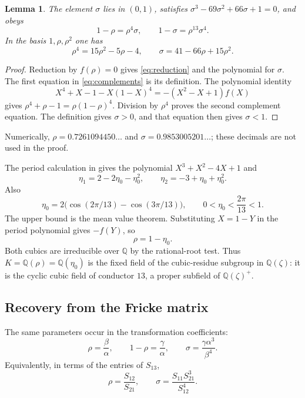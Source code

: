 \documentclass[11pt,reqno]{amsart}
\newtheorem{lemma}[theorem]{Lemma}
\theoremstyle{remark}
\numberwithin{equation}{section}
\newcommand{\QQ}{\mathbb Q}
\begin{document}
\begin{lemma}\label{lem:algebra}
The element $\sigma$ lies in $(0,1)$, satisfies
$\sigma^3-69\sigma^2+66\sigma+1=0$, and obeys
\begin{equation}\label{eq:complements}
 1-\rho=\rho^4\sigma,\qquad 1-\sigma=\rho^{13}\sigma^4.
\end{equation}
In the basis $1,\rho,\rho^2$ one has
\begin{equation}\label{eq:reduction}
 \rho^4=15\rho^2-5\rho-4,\qquad \sigma=41-66\rho+15\rho^2.
\end{equation}
\end{lemma}
\begin{proof}
Reduction by $f(\rho)=0$ gives \eqref{eq:reduction} and the polynomial for
$\sigma$. The first equation in \eqref{eq:complements} is its definition.
The polynomial identity
\[
 X^4+X-1-X(1-X)^4=-(X^2-X+1)f(X)
\]
gives $\rho^4+\rho-1=\rho(1-\rho)^4$.
Division by $\rho^4$ proves the second complement equation. The definition
gives $\sigma>0$, and that equation then gives $\sigma<1$.
\end{proof}
Numerically, $\rho=0.7261094450\ldots$ and
$\sigma=0.9853005201\ldots$; these decimals are not used in the proof.

The period calculation in \cite[Lemma~3.1]{FrickeCompanion} gives
the polynomial $X^3+X^2-4X+1$ and
\begin{equation}\label{eq:periodrelations}
 \eta_1=2-2\eta_0-\eta_0^2,\qquad
 \eta_2=-3+\eta_0+\eta_0^2.
\end{equation}
Also
\[
 \eta_0=2\bigl(\cos(2\pi/13)-\cos(3\pi/13)\bigr),\qquad
 0<\eta_0<\frac{2\pi}{13}<1.
\]
The upper bound is the mean value theorem. Substituting $X=1-Y$ in the
period polynomial gives $-f(Y)$, so
\begin{equation}\label{eq:rhoperiod}
 \rho=1-\eta_0.
\end{equation}
Both cubics are irreducible over $\QQ$ by the rational-root test. Thus
$K=\QQ(\rho)=\QQ(\eta_0)$ is the fixed field of the cubic-residue subgroup
in $\QQ(\zeta)$: it is the cyclic cubic field of conductor $13$, a proper
subfield of $\QQ(\zeta)^+$.

\subsection{Recovery from the Fricke matrix}
The same parameters occur in the transformation coefficients:
\begin{equation}\label{eq:matrixratios}
 \rho=\frac\beta\alpha,\qquad
 1-\rho=\frac\gamma\alpha,\qquad
 \sigma=\frac{\gamma\alpha^3}{\beta^4}.
\end{equation}
Equivalently, in terms of the entries of $S_{13}$,
\[
 \rho=\frac{S_{12}}{S_{21}},\qquad
 \sigma=\frac{S_{11}S_{21}^3}{S_{12}^4}.
\]
\end{document}
